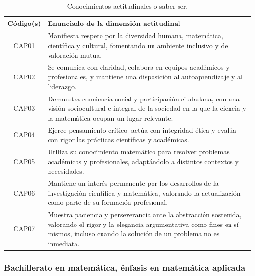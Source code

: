 \begin{table}[H]
\centering
\renewcommand{\arraystretch}{1.3}
\begin{tabular}{|c|p{9cm}|}
\hline
\cellcolor[HTML]{00C0F3}\textbf{Código(s)} & \cellcolor[HTML]{00C0F3}\textbf{Enunciado de la dimensión actitudinal} \\
\hline
CAP01 & Manifiesta respeto por la diversidad humana, matemática, científica y cultural, fomentando un ambiente inclusivo y de valoración mutua. \\
\hline
CAP02 & Se comunica con claridad, colabora en equipos académicos y profesionales, y mantiene una disposición al autoaprendizaje y al liderazgo.\\
\hline
CAP03 & Demuestra conciencia social y participación ciudadana, con una visión sociocultural e integral de la sociedad en la que la ciencia y la matemática ocupan un lugar relevante.\\
\hline
CAP04 & Ejerce pensamiento crítico, actúa con integridad ética y evalúa con rigor las prácticas científicas y académicas.\\
\hline
CAP05 & Utiliza su conocimiento matemático para resolver problemas académicos y profesionales, adaptándolo a distintos contextos y necesidades.\\
\hline
CAP06 & Mantiene un interés permanente por los desarrollos de la investigación científica y matemática, valorando la actualización como parte de su formación profesional.\\
\hline
CAP07 & Muestra paciencia y perseverancia ante la abstracción sostenida, valorando el rigor y la elegancia argumentativa como fines en sí mismos, incluso cuando la solución de un problema no es inmediata.\\
\hline
\end{tabular}
\caption{Conocimientos actitudinales o saber ser.}
\label{tab:actitudinal-egreso-integrada}
\end{table}


\subsubsection{Bachillerato en matemática, énfasis en matemática aplicada}




